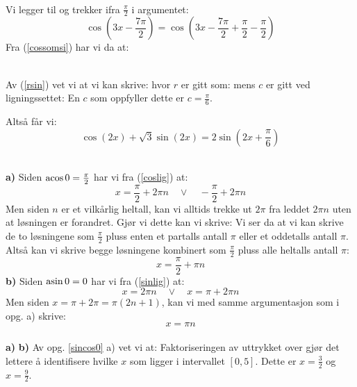 \\
Vi legger til og trekker ifra $ \frac{\pi}{2} $ i argumentet:
\[ \cos\left(3x-\frac{7\pi}{2}\right) = \cos\left(3x-\frac{7\pi}{2}+\frac{\pi}{2}-\frac{\pi}{2}\right) \]
Fra (\ref{cossomsi}) har vi da at:

\\
Av (\ref{rsin}) vet vi at vi kan skrive:
hvor $ r $ er gitt som:
mens $ c $ er gitt ved ligningssettet: 
En $ c $ som oppfyller dette er $ c = \frac{\pi}{6} $.

Altså får vi:
\[ \cos( 2x) + \sqrt 3\sin (2x) =2 \sin\left(2x+\frac{\pi}{6}\right) \]

\\
\textbf{a)} Siden $ \operatorname{acos} 0 = \frac{\pi}{2} $ har vi fra (\ref{coslig}) at:
\[ x = \frac{\pi}{2}+2\pi n\quad \vee \quad -\frac{\pi}{2}+2\pi n \]
Men siden $ n $ er et vilkårlig heltall, kan vi alltids trekke ut $ 2\pi $ fra leddet $ 2\pi n $ uten at løsningen er forandret. Gjør vi dette kan vi skrive:
Vi ser da at vi kan skrive de to løsningene som $ \frac{\pi}{2} $ pluss enten et partalls antall $ \pi $ eller et oddetalls antall $ \pi $. Altså  kan vi skrive begge løsningene kombinert som $ \frac{\pi}{2} $ pluss alle heltalls antall $ \pi $:
\[ x = \frac{\pi}{2}+\pi n \]
\textbf{b)} Siden $ \operatorname{asin} 0 = 0 $ har vi fra (\ref{sinlig}) at:
\[ x = 2\pi n \quad\vee\quad x=\pi +2\pi n \]
Men siden $ x=\pi + 2\pi=\pi(2n+1) $, kan vi med samme argumentasjon som i opg. a) skrive:
\[ x = \pi n \]
\\
\textbf{a)} 
\textbf{b)} Av opg. \ref{sincos0} a) vet vi at:
Faktoriseringen av uttrykket over gjør det lettere å identifisere hvilke $ x $ som ligger i intervallet $ [0, 5] $. Dette er $ x=\frac{3}{2} $ og $ x = \frac{9}{2} $. \vsk

